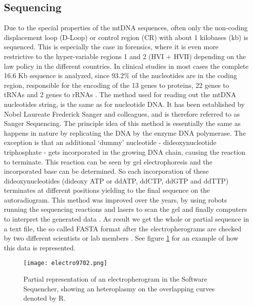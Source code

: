 \subsection{Sequencing}
Due to the special properties of the mtDNA sequences, often only the non-coding displacement loop (D-Loop) or control region (CR) with about 1 kilobases (kb) is sequenced. This is especially the case in forensics, where it is even more restrictive to the hyper-variable regions 1 and 2 (HVI + HVII) depending on the law policy in the different countries. In clinical studies in most cases the complete 16.6 Kb sequence is  analyzed, since 93.2\% of the nucleotides are in the coding region, responsible for the encoding of the 13 genes to proteins, 22 genes to tRNAs and 2 genes to rRNAs \cite{Sosa2012}. The method used for reading out the mtDNA nucleotides string, is the same as for nucleotide DNA. It has been established by Nobel Laureate Frederick Sanger and colleagues, and is therefore referred to as Sanger Sequencing. The principle idea of this method is essentially the same as happens in nature by replicating the DNA by the enzyme DNA polymerase.
The exception is that an additional `dummy' nucleotide - dideoxynucleotide triphosphate - gets incorporated in the growing DNA chain, causing the reaction to terminate. This reaction can be seen by gel electrophoresis and the incorporated base can be determined. So each incorporation of these dideoxynucleotides (dideoxy ATP or ddATP, ddCTP, ddGTP and ddTTP) terminates at different positions yielding to the final sequence on the autoradiogram.
This method was improved over the years, by using robots running the sequencing reactions and lasers to scan the gel and finally computers to interpret the generated data \cite{WallaceRobertA.SandersGeraldP.1996}. As result we get the whole or partial sequence in a text file, the so called FASTA format after the electropherograms are checked by two different scientists or lab members \cite{Weissensteiner2010}. See figure \ref{fig:figureElectro} for an example of how this data is represented. 
\begin{figure}[ht]
\begin{center}
\texttt{[image: electro9702.png]}
\caption[Representation of an electropherogram]{Partial representation of an electropherogram in the Software Sequencher, showing an heteroplasmy on the overlapping curves denoted by R.}
\label{fig:figureElectro}
\end{center}
\end{figure}

